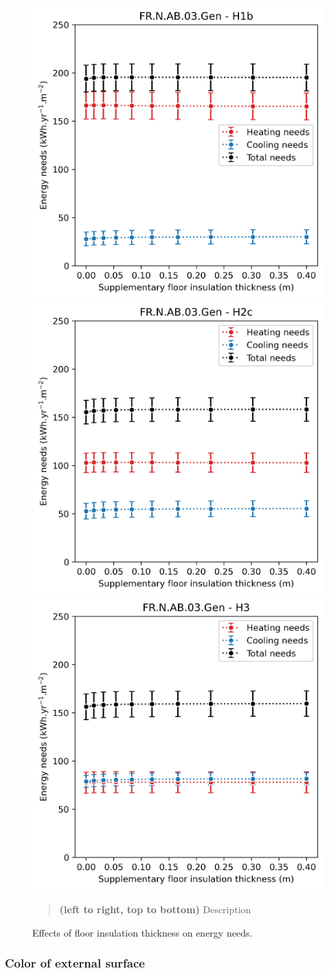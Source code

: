 \documentclass[11pt]{article}
\begin{document}
\begin{figure}[ht]
                \includegraphics[width=0.32\columnwidth]{figures/floor_FR.N.AB.03.Gen_H1b_conventionnel_th-bce_2020_2000-2020.png}
                \includegraphics[width=0.32\columnwidth]{figures/floor_FR.N.AB.03.Gen_H2c_conventionnel_th-bce_2020_2000-2020.png}
                \includegraphics[width=0.32\columnwidth]{figures/floor_FR.N.AB.03.Gen_H3_conventionnel_th-bce_2020_2000-2020.png}
                \caption{\label{fig:floor_init} Effects of floor insulation thickness on energy needs.}
                \begin{quote}
                    \vspace{-2mm}
                    \small\noindent
                    \textbf{(left to right, top to bottom)} Description
                  \end{quote}
            \end{figure}
        

        \subsubsection{Color of external surface} %
        \label{ssub:color_of_external_surface}
\end{document}
